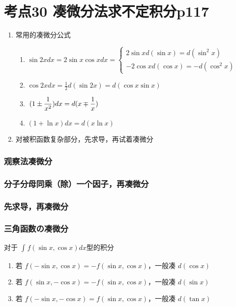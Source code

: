 \section{考点30 凑微分法求不定积分p117}

\begin{enumerate}
    \item 常用的凑微分公式
        \begin{enumerate}
        \item $\sin 2xdx=2\sin x\cos xdx=\left\{
            \begin{array}{cl}
                2\sin xd(\sin x)=d(\sin^2 x)\\
                -2\cos x d(\cos x)=-d(\cos^2 x)
            \end{array}\right.$
        \item $\cos 2xdx=\frac{1}{2}d(\sin 2x)=d(\cos x\sin x)$
        \item $\displaystyle\hspace{.2em}(1\pm \frac{1}{x^2})dx=d(x\mp \frac{1}{x})$
        \item $(1+\ln x)dx=d(x\ln x)$
    \end{enumerate}
    \item 对被积函数复杂部分，先求导，再试着凑微分
\end{enumerate}

\subsubsection{观察法凑微分}

\subsubsection{分子分母同乘（除）一个因子，再凑微分}

\subsubsection{先求导，再凑微分}

\subsubsection{三角函数の凑微分}

\begin{tcolorbox}
    
    对于 $\int_{}^{}f(\sin x,\cos x)dx$型的积分
    
    \begin{enumerate}
        \item 若 $f(-\sin x,\cos x)=-f(\sin x,\cos x)$，一般凑 $d(\cos x)$
        \item 若 $f(\sin x,-\cos x)=-f(\sin x,\cos x)$，一般凑 $d(\sin x)$
        \item 若 $f(-\sin x,-\cos x)=f(\sin x,\cos x)$，一般凑 $d(\tan x)$
    \end{enumerate}
\end{tcolorbox}
    
